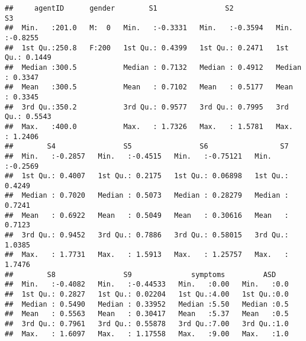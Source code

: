 \documentclass[]{article}
\newenvironment{Shaded}{\begin{snugshade}}{\end{snugshade}}
\newcommand{\KeywordTok}[1]{\textcolor[rgb]{0.13,0.29,0.53}{\textbf{#1}}}
\newcommand{\DecValTok}[1]{\textcolor[rgb]{0.00,0.00,0.81}{#1}}
\newcommand{\StringTok}[1]{\textcolor[rgb]{0.31,0.60,0.02}{#1}}
\newcommand{\CommentTok}[1]{\textcolor[rgb]{0.56,0.35,0.01}{\textit{#1}}}
\newcommand{\OperatorTok}[1]{\textcolor[rgb]{0.81,0.36,0.00}{\textbf{#1}}}
\newcommand{\NormalTok}[1]{#1}
\begin{document}
\begin{verbatim}
##     agentID      gender        S1                S2                S3         
##  Min.   :201.0   M:  0   Min.   :-0.3331   Min.   :-0.3594   Min.   :-0.8255  
##  1st Qu.:250.8   F:200   1st Qu.: 0.4399   1st Qu.: 0.2471   1st Qu.: 0.1449  
##  Median :300.5           Median : 0.7132   Median : 0.4912   Median : 0.3347  
##  Mean   :300.5           Mean   : 0.7102   Mean   : 0.5177   Mean   : 0.3345  
##  3rd Qu.:350.2           3rd Qu.: 0.9577   3rd Qu.: 0.7995   3rd Qu.: 0.5543  
##  Max.   :400.0           Max.   : 1.7326   Max.   : 1.5781   Max.   : 1.2406  
##        S4                S5                S6                 S7         
##  Min.   :-0.2857   Min.   :-0.4515   Min.   :-0.75121   Min.   :-0.2569  
##  1st Qu.: 0.4007   1st Qu.: 0.2175   1st Qu.: 0.06898   1st Qu.: 0.4249  
##  Median : 0.7020   Median : 0.5073   Median : 0.28279   Median : 0.7241  
##  Mean   : 0.6922   Mean   : 0.5049   Mean   : 0.30616   Mean   : 0.7123  
##  3rd Qu.: 0.9452   3rd Qu.: 0.7886   3rd Qu.: 0.58015   3rd Qu.: 1.0385  
##  Max.   : 1.7731   Max.   : 1.5913   Max.   : 1.25757   Max.   : 1.7476  
##        S8                S9              symptoms         ASD     
##  Min.   :-0.4082   Min.   :-0.44533   Min.   :0.00   Min.   :0.0  
##  1st Qu.: 0.2827   1st Qu.: 0.02204   1st Qu.:4.00   1st Qu.:0.0  
##  Median : 0.5490   Median : 0.33952   Median :5.50   Median :0.5  
##  Mean   : 0.5563   Mean   : 0.30417   Mean   :5.37   Mean   :0.5  
##  3rd Qu.: 0.7961   3rd Qu.: 0.55878   3rd Qu.:7.00   3rd Qu.:1.0  
##  Max.   : 1.6097   Max.   : 1.17558   Max.   :9.00   Max.   :1.0
\end{verbatim}

\begin{Shaded}
\end{Shaded}
\end{document}
